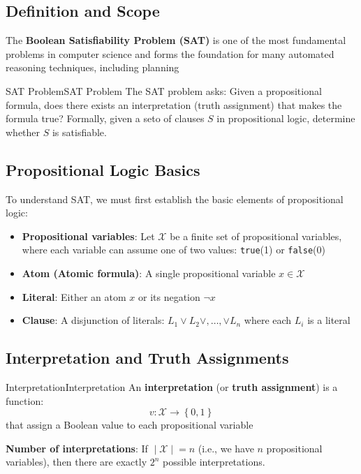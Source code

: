 \documentclass[a4paper]{article}
\theoremstyle{definition}
\begin{document}
\subsection{Definition and Scope}
The \textbf{Boolean Satisfiability Problem (SAT)} is one of the most fundamental problems in computer science and forms 
the foundation for many automated reasoning techniques, including planning 
\begin{definition}{SAT Problem}{SAT Problem}
The SAT problem asks: Given a propositional formula, does there exists an interpretation (truth assignment) that makes 
the formula true? Formally, given a seto of clauses \( S \) in propositional logic, determine whether \( S \) is satisfiable.
\end{definition}
\subsection{Propositional Logic Basics}
To understand SAT, we must first establish the basic elements of propositional logic:
\begin{itemize}
    \item \textbf{Propositional variables}: Let \( \mathcal{X} \) be a finite set of propositional variables, where each variable can assume one of two values: \texttt{true}(1) or \texttt{false}(0)
    \item \textbf{Atom (Atomic formula)}: A single propositional variable \( x \in \mathcal{X} \)    
    \item \textbf{Literal}: Either an atom \( x \) or its negation \( \lnot x \)     
    \item \textbf{Clause}: A disjunction of literals: \( L_1 \vee L_2 \vee, \ldots, \vee L_n \) where each \( L_i \) is a literal
\end{itemize}
\subsection{Interpretation and Truth Assignments}
\begin{definition}{Interpretation}{Interpretation}
An \textbf{interpretation} (or \textbf{truth assignment}) is a function:
\[
  v: \mathcal{X} \rightarrow \left\{ 0,1 \right\}
\]
that assign a Boolean value to each propositional variable
\end{definition}
\textbf{Number of interpretations}: If \( \;|\;\mathcal{X}\;|\; = n \) (i.e., we have $n$ propositional variables), then there are exactly 
\( 2^n \) possible interpretations.
\end{document}
